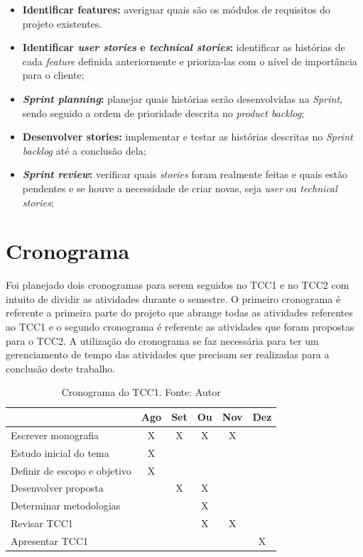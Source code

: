 \begin{itemize}
    \item \textbf{Identificar features:} averiguar quais são os módulos de requisitos do projeto existentes.
    
    \item \textbf{Identificar \textit{user stories} e \textit{technical stories}:} identificar as histórias de cada \textit{feature} definida anteriormente e prioriza-las com o nível de importância para o cliente;
    
    \item \textbf{\textit{Sprint planning}:} planejar quais histórias serão desenvolvidas na \textit{Sprint}, sendo seguido a ordem de prioridade descrita no \textit{product backlog};
    
    \item \textbf{Desenvolver stories:} implementar e testar as histórias descritas no \textit{Sprint backlog} até a conclusão dela;
    
    \item \textbf{\textit{Sprint review}:} verificar quais \textit{stories} foram realmente feitas e quais estão pendentes e se houve a necessidade de criar novas, seja \textit{user} ou \textit{technical stories};
\end{itemize}

\section{Cronograma}

Foi planejado dois cronogramas para serem seguidos no TCC1 e no TCC2 com intuito de dividir as atividades durante o semestre. O primeiro cronograma é referente a primeira parte do projeto que abrange todas as atividades referentes ao TCC1 e o segundo cronograma é referente as atividades que foram propostas para o TCC2. A utilização do cronograma se faz necessária para ter um gerenciamento de tempo das atividades que precisam ser realizadas para a conclusão deste trabalho.

\begin{table}[H]
\centering
\begin{tabular}{lccccc}
\hline
\textbf{} & \textbf{Ago} & \textbf{Set} & \textbf{Ou} & \textbf{Nov} & \textbf{Dez} \\ \hline
Escrever monografia & X & X & X & X &  \\ \hline
Estudo inicial do tema & X &  &  &  &  \\ \hline
Definir de escopo e objetivo & X &  &  &  &  \\ \hline
Desenvolver proposta &  & X & X &  &  \\ \hline
Determinar metodologias &  &  & X &  &  \\ \hline
Revisar TCC1 &  &  & X & X &  \\ \hline
Apresentar TCC1 &  &  &  &  & X \\ \hline
\end{tabular}
\caption[Cronograma do TCC1]{Cronograma do TCC1. Fonte: Autor}
\end{table}

